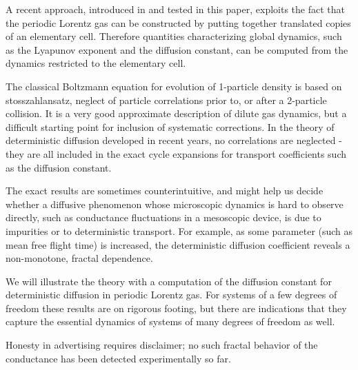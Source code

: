 A recent approach, introduced in  and
tested in this paper, exploits the fact that the periodic Lorentz
gas
can be constructed by putting together
translated copies of an elementary cell.
Therefore quantities characterizing global dynamics, such as
the Lyapunov exponent and the diffusion constant, can be
computed from the dynamics restricted to the elementary cell.

The classical Boltzmann equation for evolution of 1-particle density is
based on stosszahlansatz, neglect of particle correlations prior to, or
after a 2-particle collision. It is a very good approximate description
of dilute gas dynamics, but a difficult starting point for inclusion of
systematic corrections. In the theory of deterministic diffusion
developed in recent years, no correlations are neglected - they are all
included in the exact cycle expansions for transport coefficients such as
the diffusion constant.

The exact results are sometimes counterintuitive, and might help us
decide whether a diffusive phenomenon whose microscopic dynamics is hard
to observe directly, such as conductance fluctuations in a mesoscopic
device, is due to impurities or to deterministic transport. For example,
as some parameter (such as mean free flight time) is increased, the
deterministic diffusion coefficient reveals a non-monotone, fractal
dependence.

We will illustrate the theory with a computation of the
diffusion constant for deterministic diffusion in periodic Lorentz gas.
For systems of a few degrees of freedom these results are on rigorous
footing, but there are indications that they capture the essential
dynamics of systems of many degrees of freedom as well.

Honesty in
advertising requires disclaimer; no such fractal behavior of the
conductance has been detected experimentally so far.
